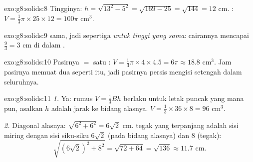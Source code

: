 \begin{solution}{exo:g8:solids:8}
Tingginya: $h = \sqrt{13^2 - 5^2} = \sqrt{169 - 25} = \sqrt{144} = 12$
cm. : $V = \frac13 \pi \times 25 \times 12 = 100\pi$ cm$^3$.
\end{solution}

\begin{solution}{exo:g8:solids:9}
 sama, jadi   sepertiga  
\emph{untuk tinggi yang sama}: cairannya mencapai
$\frac{9}{3} = 3$ cm di dalam .
\end{solution}

\begin{solution}{exo:g8:solids:10}
Pasirnya $=$ satu : $V = \frac13 \pi \times 4 \times 4.5 = 6\pi
\approx 18.8$ cm$^3$. Jam pasirnya memuat dua  seperti itu,
jadi pasirnya persis mengisi setengah  dalam seluruhnya.
\end{solution}

\begin{solution}{exo:g8:solids:11}
\emph{1.} Ya: rumus $V = \frac13 Bh$ berlaku untuk letak puncak yang
mana pun, asalkan $h$ adalah jarak  ke bidang alasnya.
$V = \frac13 \times 36 \times 8 = 96$ cm$^3$.

\emph{2.} Diagonal alasnya: $\sqrt{6^2 + 6^2} = 6\sqrt2$ cm. 
tegak yang terpanjang adalah sisi miring  dengan
sisi siku-siku $6\sqrt2$ (pada bidang alasnya) dan $8$ (tegak):
\[
\sqrt{(6\sqrt2)^2 + 8^2} = \sqrt{72 + 64} = \sqrt{136} \approx 11.7
\text{ cm}.
\]
\end{solution}

